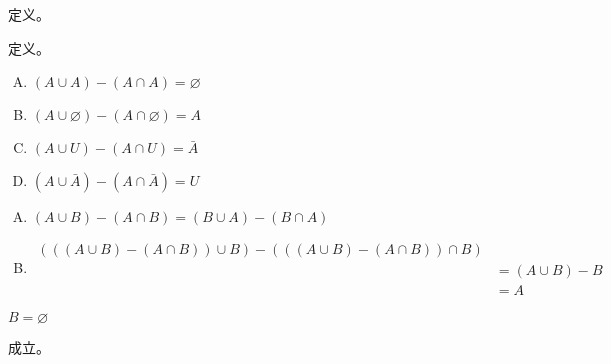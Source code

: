 {{\begin{practices}
        \end{practices}

        \begin{practices}
            定义。
        \end{practices}

        \begin{practices}
            定义。
        \end{practices}

        \begin{practices}
            \begin{enumerate}[A.]
                \item $(A \cup A) - (A \cap A) = \varnothing$
                \item $(A \cup \varnothing) - (A \cap \varnothing) = A$
                \item $(A \cup U) - (A \cap U) = \bar{A}$
                \item $(A \cup \bar{A}) - (A \cap \bar{A}) = U$
            \end{enumerate}
        \end{practices}

        \begin{practices}
            \begin{enumerate}[A.]
                \item $(A \cup B) - (A \cap B) = (B \cup A) - (B \cap A)$
                \item
                {
                    \begin{align*}
                        (((A \cup B) - (A \cap B)) \cup B) - (((A \cup B) - (A \cap B)) \cap B) \\
                        &= (A \cup B) - B \\
                        &= A
                    \end{align*}
                }
            \end{enumerate}
        \end{practices}

        \begin{practices}
            $B = \varnothing$
        \end{practices}

        \begin{practices}
            成立。
        \end{practices}

}}
